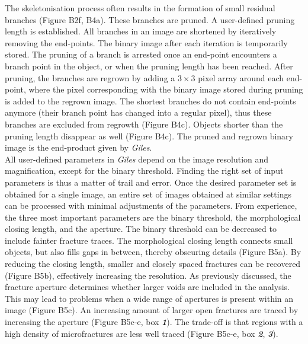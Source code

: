 \documentclass{article}
\begin{document}
\begin{multicols}{2}
The skeletonisation process often results in the formation of small residual branches (Figure B2f, B4a). These branches are pruned. A user-defined pruning length is established. All branches in an image are shortened by iteratively removing the end-points. The binary image after each iteration is temporarily stored. The pruning of a branch is arrested once an end-point encounters a branch point in the object, or when the pruning length has been reached. After pruning, the branches are regrown by adding a $3\times3$ pixel array around each end-point, where the pixel corresponding with the  binary image stored during pruning is added to the regrown image. The shortest branches do not contain end-points anymore (their branch point has changed into a regular pixel), thus these branches are excluded from regrowth (Figure B4c). Objects shorter than the pruning length disappear as well (Figure B4c). The pruned and regrown binary image is the end-product given by \textit{Giles}. \\

All user-defined parameters in \textit{Giles} depend on the image resolution and magnification, except for the binary threshold. Finding the right set of input parameters is thus a matter of trail and error. Once the desired parameter set is obtained for a single image, an entire set of images obtained at similar settings can be processed with minimal adjustments of the parameters. From experience, the three most important parameters are the binary threshold, the morphological closing length, and the aperture. The binary threshold can be decreased to include fainter fracture traces. The morphological closing length connects small objects, but also fills gaps in between, thereby obscuring details (Figure B5a). By reducing the closing length, smaller and closely spaced fractures can be recovered (Figure B5b), effectively increasing the resolution. As previously discussed, the fracture aperture determines whether larger voids are included in the analysis. This may lead to problems when a wide range of apertures is present within an image (Figure B5c). An increasing amount of larger open fractures are traced by increasing the aperture (Figure B5c-e, box \textbf{\textit{1}}). The trade-off is that regions with a high density of microfractures are less well traced (Figure B5c-e, box \textbf{\textit{2}}, \textbf{\textit{3}}). 


\end{multicols}
\end{document}
